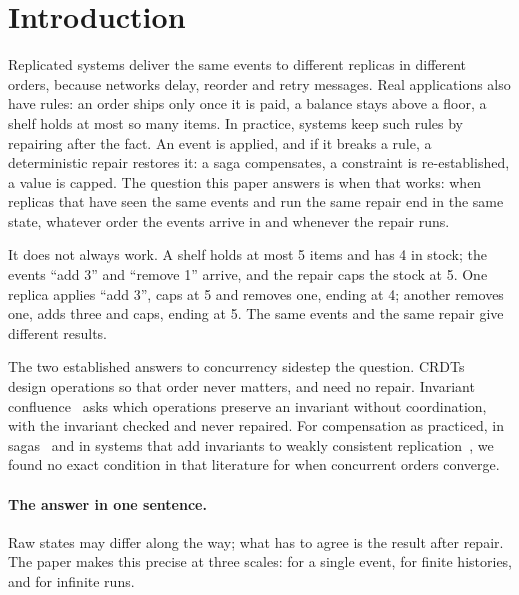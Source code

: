 
\section{Introduction}\label{sec:intro}

Replicated systems deliver the same events to different replicas in different orders, because networks
delay, reorder and retry messages. Real applications also have rules: an order ships only once it is
paid, a balance stays above a floor, a shelf holds at most so many items. In practice, systems keep such
rules by repairing after the fact. An event is applied, and if it breaks a rule, a deterministic repair
restores it: a saga compensates, a constraint is re-established, a value is capped. The question this
paper answers is when that works: when replicas that have seen the same events and run the same repair
end in the same state, whatever order the events arrive in and whenever the repair runs.

It does not always work. A shelf holds at most 5 items and has 4 in stock; the events ``add 3'' and
``remove 1'' arrive, and the repair caps the stock at 5. One replica applies ``add 3'', caps at 5 and
removes one, ending at 4; another removes one, adds three and caps, ending at 5. The same events and the
same repair give different results.

The two established answers to concurrency sidestep the question. CRDTs~\cite{shapiro2011} design
operations so that order never matters, and need no repair. Invariant
confluence~\cite{bailis2014} asks which operations preserve an invariant without coordination, with the
invariant checked and never repaired. For compensation as practiced, in sagas~\cite{garcia1987} and in
systems that add invariants to weakly consistent replication~\cite{li2012,balegas2015}, we found no
exact condition in that literature for when concurrent orders converge.

\paragraph{The answer in one sentence.} Raw states may differ along the way; what has to agree is the
result after repair. The paper makes this precise at three scales: for a single event, for finite
histories, and for infinite runs.

